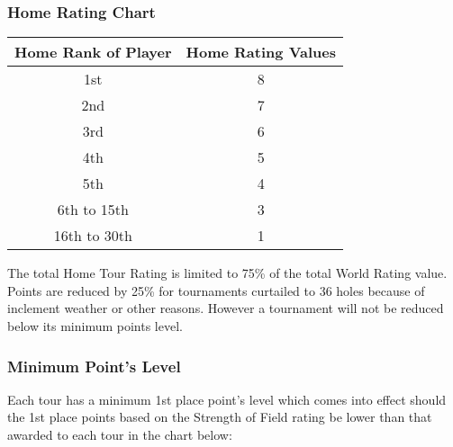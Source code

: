 \documentclass{article}
\begin{document}
\subsubsection{Home Rating Chart}

\begin{center}
\begin{tabular}{ | c | c | }
\hline
Home Rank of Player	&Home Rating Values\\
\hline
1st	&8\\
2nd	&7\\
3rd	&6\\
4th	&5\\
5th	&4\\
6th to 15th	&3\\
16th to 30th	&1\\
\hline
\end{tabular}
\end{center}

The total Home Tour Rating is limited to 75\% of the total World Rating value. \\
Points are reduced by 25\% for tournaments curtailed to 36 holes because of inclement weather or other reasons. However a tournament will not be reduced below its minimum points level.

\subsubsection{Minimum Point’s Level}

Each tour has a minimum 1st place point’s level which comes into effect should the 1st place points based on the Strength of Field rating be lower than that awarded to each tour in the chart below:
\end{document}
